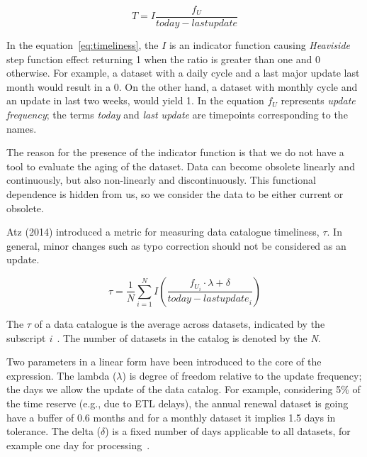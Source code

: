 \begin{equation}\label{eq:timeliness}
    T = I \frac{f_U}{today - last update}
\end{equation}

In the equation~\ref{eq:timeliness}, the \( I \) is an indicator function causing \textit{Heaviside} step function effect returning 1 when the ratio is greater than one and 0 otherwise.
For example, a dataset with a daily cycle and a last major update last month would result in a 0.
On the other hand, a dataset with monthly cycle and an update in last two weeks, would yield 1.
In the equation \( f_U \) represents \textit{update frequency}; the terms \textit{today} and \textit{last update} are timepoints corresponding to the names.

The reason for the presence of the indicator function is that we do not have a tool to evaluate the aging of the dataset.
Data can become obsolete linearly and continuously, but also non-linearly and discontinuously.
This functional dependence is hidden from us, so we consider the data to be either current or obsolete.


Atz (2014) introduced a metric for measuring data catalogue timeliness, \( \tau \).
In general, minor changes such as typo correction should not be considered as an update.

\begin{equation*}
    \tau = \frac{1}{N} \sum_{i = 1}^N I \left( \frac{f_{U_i} \cdot \lambda + \delta}{today - {last update}_i} \right)
\end{equation*}

The \( \tau \) of a data catalogue is the average across datasets, indicated by the subscript \textit{i}~\cite{atz2014tau}.
The number of datasets in the catalog is denoted by the \textit{N}.

Two parameters in a linear form have been introduced to the core of the expression.
The lambda (\( \lambda \)) is degree of freedom relative to the update frequency; the days we allow the update of the data catalog.
For example, considering 5\% of the time reserve (e.g., due to ETL delays), the annual renewal dataset is going have a buffer of 0.6 months and for a monthly dataset it implies 1.5 days in tolerance.
The delta (\( \delta \)) is a fixed number of days applicable to all datasets, for example one day for processing~\cite{atz2014tau}.

